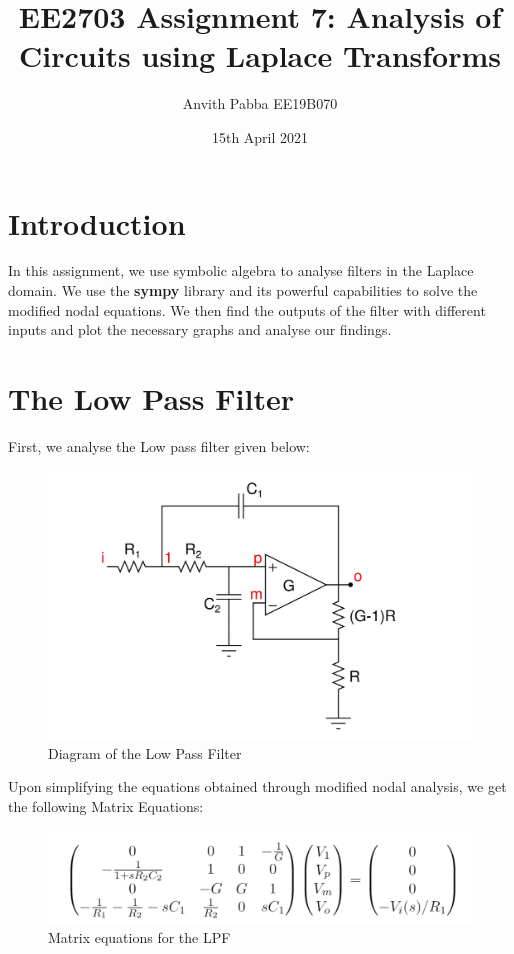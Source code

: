 \documentclass[11pt]{article}
\title{EE2703 Assignment 7:  Analysis of Circuits using Laplace Transforms}
\author{Anvith Pabba EE19B070}
\date{15th April 2021}
\begin{document}
\maketitle

\section{Introduction}

In this assignment, we use symbolic algebra to analyse filters in the Laplace domain. We use the \textbf{sympy} library and its powerful capabilities to solve the modified nodal equations. We then find the outputs of the filter with different inputs and plot the necessary graphs and analyse our findings.

\section{The Low Pass Filter}
First, we analyse the Low pass filter given below:

\begin{figure}[H]
    \centering
    \includegraphics[scale = 1]{LPF.jpg}
    \caption{Diagram of the Low Pass Filter}
\end{figure}

Upon simplifying the equations obtained through modified nodal analysis, we get the following Matrix Equations:

\begin{figure}[H]
    \centering
    \includegraphics[scale = 1]{LPF_eqns.jpg}
    \caption{Matrix equations for the LPF}
\end{figure}
\end{document}

